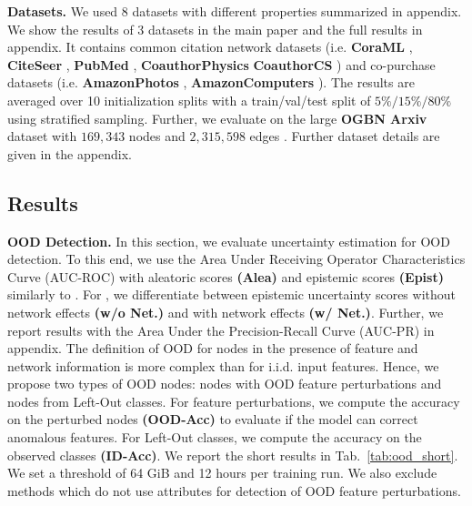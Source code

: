 \textbf{Datasets.} We used 8 datasets with different properties summarized in appendix. We show the results of 3 datasets in the main paper and the full results in appendix. It contains common citation network datasets (i.e. \textbf{CoraML} \citep{Mccallum2000, Giles1998, Getoor2005, Sen2008a}, \textbf{CiteSeer} \citep{Giles1998, Getoor2005, Sen2008a}, \textbf{PubMed} \citep{Namata2012}, \textbf{CoauthorPhysics} \citep{Shchur2018} \textbf{CoauthorCS} \citep{Shchur2018})
 and co-purchase datasets (i.e. \textbf{AmazonPhotos} \citep{Mcauley2015, Shchur2018}, \textbf{AmazonComputers} \citep{Mcauley2015, Shchur2018}). The results are averaged over 10 initialization splits with a train/val/test split of $5\%/15\%/80\%$ using stratified sampling. Further, we evaluate on the large \textbf{OGBN Arxiv} dataset with $169,343$ nodes and $2,315,598$ edges \citep{ogb-dataset, microsoft-academic-graph}. Further dataset details are given in the appendix.
 
\subsection{Results}
 
\textbf{OOD Detection.} In this section, we evaluate uncertainty estimation for OOD detection. To this end, we use the Area Under Receiving Operator Characteristics Curve (AUC-ROC) with aleatoric scores  \textbf{(Alea)} and epistemic scores  \textbf{(Epist)} similarly to \citep{Charpentier2020, Zhao2020, Malinin2018, Malinin2019a, Malinin2019b, Liu2020a}. For \oursacro{}, we differentiate between epistemic uncertainty scores without network effects \textbf{(w/o Net.)} and with network effects \textbf{(w/ Net.)}. Further, we report results with the Area Under the Precision-Recall Curve (AUC-PR) in appendix. The definition of OOD for nodes in the presence of feature and network information is more complex than for i.i.d. input features. Hence, we propose two types of OOD nodes: nodes with OOD feature perturbations and nodes from Left-Out classes. For feature perturbations, we compute the accuracy on the perturbed nodes \textbf{(OOD-Acc)} to evaluate if the model can correct anomalous features. For Left-Out classes, we compute the accuracy on the observed classes \textbf{(ID-Acc)}. We report the short results in Tab.~\ref{tab:ood_short}. We set a threshold of 64 GiB and 12 hours per training run. We also exclude methods which do not use attributes for detection of OOD feature perturbations. 


